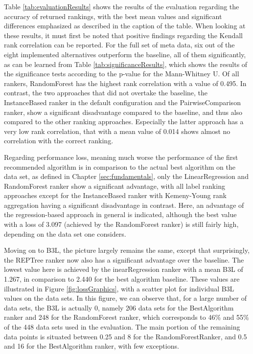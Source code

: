 Table \ref{tab:evaluationResults} shows the results of the evaluation regarding the accuracy of returned rankings, with the best mean values and significant differences emphasized as described in the caption of the table. When looking at these results, it must first be noted that positive findings regarding the Kendall rank correlation can be reported. For the full set of meta data, six out of the eight implemented alternatives outperform the baseline, all of them significantly, as can be learned from Table \ref{tab:significanceResults}, which shows the results of the significance tests according to the p-value for the Mann-Whitney U. Of all rankers, RandomForest has the highest rank correlation with a value of 0.495. In contrast, the two approaches that did not overtake the baseline, the InstanceBased ranker in the default configuration and the PairwiseComparison ranker, show a significant disadvantage compared to the baseline, and thus also compared to the other ranking approaches. Especially the latter approach has a very low rank correlation, that with a mean value of 0.014 shows almost no correlation with the correct ranking. 

Regarding performance loss, meaning much worse the performance of the first recommended algorithm is in comparison to the actual best algorithm on the data set, as defined in Chapter \ref{sec:fundamentals}, only the LinearRegression and RandomForest ranker show a significant advantage, with all label ranking approaches except for the InstanceBased ranker with Kemeny-Young rank aggregation having a significant disadvantage in contrast. Here, an advantage of the regression-based approach in general is indicated, although the best value with a loss of 3.097 (achieved by the RandomForest ranker) is still fairly high, depending on the data set one considers. 

Moving on to B3L, the picture largely remains the same, except that surprisingly, the REPTree ranker now also has a significant advantage over the baseline. The lowest value here is achieved by the inearRegression ranker with a mean B3L of 1.267, in comparison to 2.440 for the best algorithm baseline. These values are illustrated in Figure \ref{fig:lossGraphics}, with a scatter plot for individual B3L values on the data sets. In this figure, we can observe that, for a large number of data sets, the B3L is actually 0, namely 206 data sets for the BestAlgorithm ranker and 248 for the RandomForest ranker, which corresponds to 46\% and 55\% of the 448 data sets used in the evaluation. The main portion of the remaining data points is situated between 0.25 and 8 for the RandomForestRanker, and 0.5 and 16 for the BestAlgorithm ranker, with few exceptions. 

